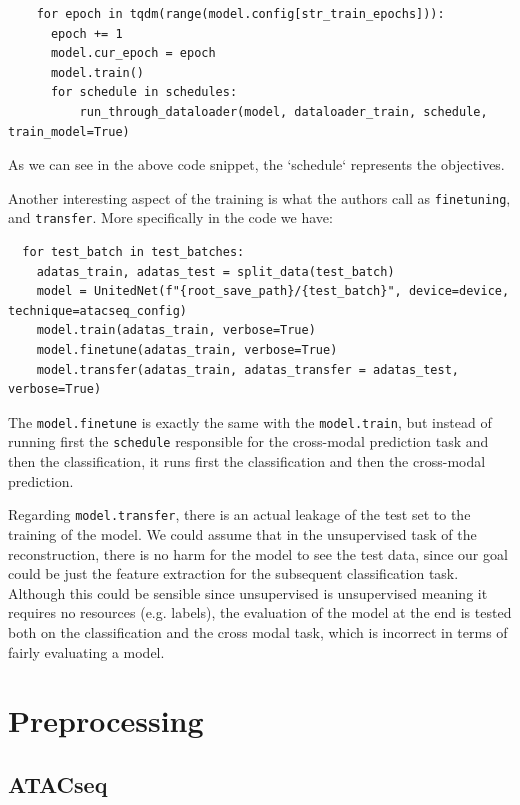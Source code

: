 \documentclass[12pt, a4paper]{article}
\begin{document}
\begin{verbatim}
    for epoch in tqdm(range(model.config[str_train_epochs])):
      epoch += 1
      model.cur_epoch = epoch
      model.train()
      for schedule in schedules:
          run_through_dataloader(model, dataloader_train, schedule, train_model=True)
\end{verbatim}

As we can see in the above code snippet, the `schedule` represents the objectives.

Another interesting aspect of the training is what the authors call as \verb|finetuning|, and \verb|transfer|. More specifically in the code we have:

\begin{verbatim}
  for test_batch in test_batches:
    adatas_train, adatas_test = split_data(test_batch)
    model = UnitedNet(f"{root_save_path}/{test_batch}", device=device, technique=atacseq_config)
    model.train(adatas_train, verbose=True)
    model.finetune(adatas_train, verbose=True)
    model.transfer(adatas_train, adatas_transfer = adatas_test, verbose=True)
\end{verbatim}

The \verb|model.finetune| is exactly the same with the \verb|model.train|, but instead of running first the \verb|schedule| responsible for the cross-modal prediction task and then the classification, it runs first the classification and then the cross-modal prediction.

Regarding \verb|model.transfer|, there is an actual leakage of the test set to the training of the model. We could assume that in the unsupervised task of the reconstruction, there is no harm for the model to see the test data, since our goal could be just the feature extraction for the subsequent classification task. Although this could be sensible since unsupervised is unsupervised meaning it requires no resources (e.g. labels), the evaluation of the model at the end is tested both on the classification and the cross modal task, which is incorrect in terms of fairly evaluating a model.


\clearpage


\section{Preprocessing}

\subsection{ATACseq}
\label{sec:atacseq}
\end{document}
